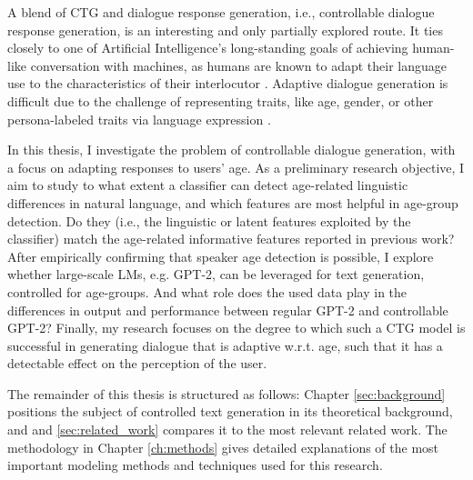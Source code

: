 A blend of CTG and dialogue response generation, i.e., controllable dialogue response generation, is an interesting and only partially explored route. It ties closely to one of Artificial Intelligence's long-standing goals of achieving human-like conversation with machines, as humans are known to adapt their language use to the characteristics of their interlocutor \citep{gallois2015communication}. Adaptive dialogue generation is difficult due to the challenge of representing traits, like age, gender, or other persona-labeled traits via language expression \citep{zheng2019personalized}.

In this thesis, I investigate the problem of controllable dialogue generation, with a focus on adapting responses to users' age. As a preliminary research objective, I aim to study to what extent a classifier can detect age-related linguistic differences in natural language, and which features are most helpful in age-group detection. Do they (i.e., the linguistic or latent features exploited by the classifier) match the age-related informative features reported in previous work? 
After empirically confirming that speaker age detection is possible, I explore whether large-scale LMs, e.g. GPT-2, can be leveraged for text generation, controlled for age-groups. And what role does the used data play in the differences in output and performance between regular GPT-2 and controllable GPT-2?
Finally, my research focuses on the degree to which such a CTG model is successful in generating dialogue that is adaptive w.r.t. age, such that it has a detectable effect on the perception of the user.

The remainder of this thesis is structured as follows: Chapter \ref{sec:background} positions the subject of controlled text generation in its theoretical background, and and \ref{sec:related_work} compares it to the most relevant related work. The methodology in Chapter \ref{ch:methods} gives detailed explanations of the most important modeling methods and techniques used for this research.


